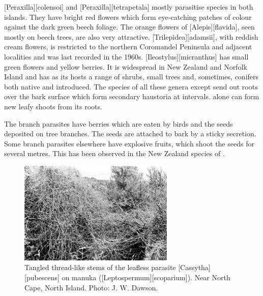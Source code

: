 [Peraxilla][colensoi] and [Peraxilla][tetrapetala] mostly parasitise  species in both islands.
They have bright red flowers which form eye-catching patches of colour against the dark green beech foliage.
The orange flowers of [Alepis][flavida], seen mostly on beech trees, are also very attractive. [Trilepidea][adamsii], with reddish cream flowers, is restricted to the northern Coromandel Peninsula and adjacent localities and was last recorded in the 1960s. [Ileostylus][micranthus] has small green flowers and yellow berries.
It is widespread in New Zealand and Norfolk Island and has as its hosts a range of shrubs, small trees and, sometimes, conifers both native and introduced.
The species of all these genera except  send out roots over the bark surface which form secondary haustoria at intervals.  alone can form new leafy shoots from its roots.

The branch parasites have berries which are eaten by birds and the seeds deposited on tree branches.
The seeds are attached to bark by a sticky secretion.
Some branch parasites elsewhere have explosive fruits, which shoot the seeds for several metres.
This has been observed in the New Zealand species of .

\begin{figure}
	\includegraphics[width=0.66\textwidth]{graphics/figure59cassytha.jpg}
	\centering
	\caption[Tangled thread-like stems of the leafless parasite \emph{Cassytha pubescens}]{Tangled thread-like stems of the leafless parasite [Cassytha][pubescens] on manuka ([Leptospermum][scoparium]).
	Near North Cape, North Island.
	Photo: J. W. Dawson.}%
	\label{fig:59cassytha}
\end{figure}

